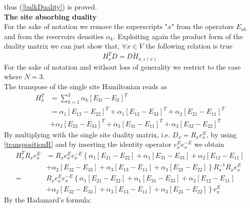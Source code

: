 \documentclass[11pt]{article}
\numberwithin{equation}{subsection}
\begin{document}
thus (\ref{bulkDuality}) is proved.\\
\textbf{The site absorbing duality}\\
For the sake of notation we remove the superscripts "$x$" from the operators $E_{ab}$ and from the reservoirs densities $\alpha_{k}$. Exploiting again the product form of the duality matrix we can just show that, $\forall x\in V$ the following relation is true 
\begin{equation}\label{boundaryDuality}
    	H_{x}^{T}D=D\widetilde{H}_{x,\varepsilon(x)}
\end{equation}
For the sake of notation and without loss of generality we restrict to the case where $N=3$. \\
The transpose of the single site Hamiltonian reads as
\begin{equation}
	\begin{split}
	H_{x}^{T}&=\sum_{k=1}^{3}\alpha_{k}\left[E_{kl}-E_{ll}\right]^{T}\\&=
	\alpha_{1}\left[E_{12}-E_{22}\right]^{T}+\alpha_{1}\left[E_{13}-E_{33}\right]^{T}+\alpha_{2}\left[E_{21}-E_{11}\right]^{T}\\&+\alpha_{2}\left[E_{23}-E_{33}\right]^{T}+
	\alpha_{3}\left[E_{31}-E_{11}\right]^{T}+\alpha_{3}\left[E_{32}-E_{22}\right]^{T}
	\end{split}
\end{equation}
By multiplying with the single site duality matrix, i.e. $D_{x}=R_{x}e^{E}_{x}$, by using \eqref{transpositionR} and by inserting the identity operator $e^{E}_{x}e^{-E}_{x}$ we obtain 
\begin{equation}\label{transposeRBoundary}
	\begin{split}
	H^{T}_{x}R_{x}e_{x}^{E}&=R_{x}e_{x}^{E}e_{x}^{-E}\left\{\alpha_{1}\left[E_{21}-E_{22}\right]+\alpha_{1}\left[E_{31}-E_{33}\right]+\alpha_{2}\left[E_{12}-E_{11}\right]\right.\\&+\left.\alpha_{2}\left[E_{32}-E_{33}\right]+
	\alpha_{3}\left[E_{13}-E_{11}\right]+\alpha_{3}\left[E_{23}-E_{22}\right]\right\}R^{-1}_{x}R_{x}e^{E}_{x}\\=&
	R_{x}e_{x}^{E}e_{x}^{-E}\left\{\alpha_{1}\left[E_{21}-E_{22}\right]+\alpha_{1}\left[E_{31}-E_{33}\right]+\alpha_{2}\left[E_{12}-E_{11}\right]\right.\\&+\left.\alpha_{2}\left[E_{32}-E_{33}\right]+
	\alpha_{3}\left[E_{13}-E_{11}\right]+\alpha_{3}\left[E_{23}-E_{22}\right]\right\}e^{E}_{x}
	\end{split}
\end{equation}
By the Hadamard's formula:
\end{document}
